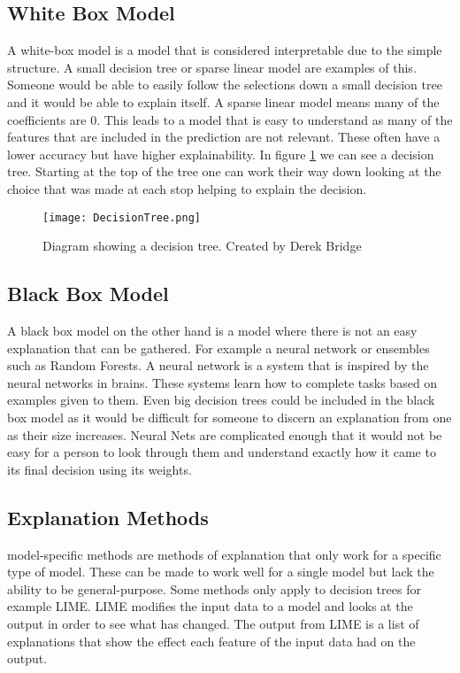         \subsection{White Box Model}
            A white-box model is a model that is considered interpretable due to the simple structure. A small decision tree or sparse linear model are examples of this. Someone would be able to easily follow the selections down a small decision tree and it would be able to explain itself. A sparse linear model means many of the coefficients are 0. This leads to a model that is easy to understand as many of the features that are included in the prediction are not relevant. These often have a lower accuracy but have higher explainability. In figure \ref{fig:DecisionTreePic} we can see a decision tree. Starting at the top of the tree one can work their way down looking at the choice that was made at each stop helping to explain the decision. 


            \begin{figure}
                \texttt{[image: DecisionTree.png]}
                \label{fig:DecisionTreePic}
                \caption{Diagram showing a decision tree. Created by Derek Bridge  }
                \cite{DecisionTreeImage}
            \end{figure}


        \subsection{Black Box Model}
            A black box model on the other hand is a model where there is not an easy explanation that can be gathered. For example a neural network or ensembles such as Random Forests. A neural network is a system that is inspired by the neural networks in brains. These systems learn how to complete tasks based on examples given to them.
            Even big decision trees could be included in the black box model as it would be difficult for someone to discern an explanation from one as their size increases. Neural Nets are complicated enough that it would not be easy for a person to look through them and understand exactly how it came to its final decision using its weights. 


        \subsection{Explanation Methods}
            model-specific methods are methods of explanation that only work for a specific type of model. These can be made to work well for a single model but lack the ability to be general-purpose. Some methods only apply to decision trees for example LIME. LIME modifies the input data to a model and looks at the output in order to see what has changed. The output from LIME is a list of explanations that show the effect each feature of the input data had on the output. 

